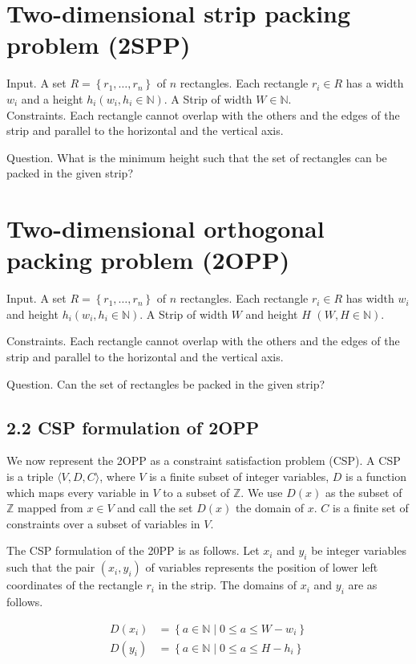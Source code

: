 \documentclass[10pt]{article}
\begin{document}
\section*{Two-dimensional strip packing problem (2SPP)}
Input. A set $R=\left\{r_{1}, \ldots, r_{n}\right\}$ of $n$ rectangles. Each rectangle $r_{i} \in R$ has a width $w_{i}$ and a height $h_{i}\left(w_{i}, h_{i} \in \mathbb{N}\right)$. A Strip of width $W \in \mathbb{N}$.\\
Constraints. Each rectangle cannot overlap with the others and the edges of the strip and parallel to the horizontal and the vertical axis.

Question. What is the minimum height such that the set of rectangles can be packed in the given strip?

\section*{Two-dimensional orthogonal packing problem (2OPP)}
Input. A set $R=\left\{r_{1}, \ldots, r_{n}\right\}$ of $n$ rectangles. Each rectangle $r_{i} \in R$ has width $w_{i}$ and height $h_{i}\left(w_{i}, h_{i} \in \mathbb{N}\right)$. A Strip of width $W$ and height $H$ $(W, H \in \mathbb{N})$.

Constraints. Each rectangle cannot overlap with the others and the edges of the strip and parallel to the horizontal and the vertical axis.

Question. Can the set of rectangles be packed in the given strip?

\subsection*{2.2 CSP formulation of 2OPP}
We now represent the 2OPP as a constraint satisfaction problem (CSP). A CSP is a triple $\langle V, D, C\rangle$, where $V$ is a finite subset of integer variables, $D$ is a function which maps every variable in $V$ to a subset of $\mathbb{Z}$. We use $D(x)$ as the subset of $\mathbb{Z}$ mapped from $x \in V$ and call the set $D(x)$ the domain of $x$. $C$ is a finite set of constraints over a subset of variables in $V$.

The CSP formulation of the 20PP is as follows. Let $x_{i}$ and $y_{i}$ be integer variables such that the pair $\left(x_{i}, y_{i}\right)$ of variables represents the position of lower left coordinates of the rectangle $r_{i}$ in the strip. The domains of $x_{i}$ and $y_{i}$ are as follows.


\begin{align*}
D\left(x_{i}\right) & =\left\{a \in \mathbb{N} \mid 0 \leq a \leq W-w_{i}\right\} \\
D\left(y_{i}\right) & =\left\{a \in \mathbb{N} \mid 0 \leq a \leq H-h_{i}\right\} \tag{1}
\end{align*}
\end{document}
